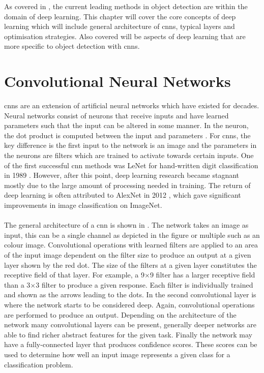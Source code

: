 As covered in , the current leading methods in object detection are within the domain of deep learning. This chapter will cover the core concepts of deep learning which will include general architecture of \glspl{cnn}, typical layers and optimisation strategies. Also covered will be aspects of deep learning that are more specific to object detection with \glspl{cnn}.

\section{Convolutional Neural Networks}
\glspl{cnn} are an extension of artificial neural networks which have existed for decades. Neural networks consist of neurons that receive inputs and have learned parameters such that the input can be altered in some manner. In the neuron, the dot product is computed between the input and parameters \cite{cs321n}. For \glspl{cnn}, the key difference is the first input to the network is an image and the parameters in the neurons are filters which are trained to activate towards certain inputs. One of the first successful \gls{cnn} methods was LeNet for hand-written digit classification in 1989 \cite{lenet}. However, after this point, deep learning research became stagnant mostly due to the large amount of processing needed in training. The return of deep learning is often attributed to AlexNet in 2012 \cite{alexnet}, which gave significant improvements in image classification on ImageNet.
\\\\
The general architecture of a \gls{cnn} is shown in . The network takes an image as input, this can be a single channel as depicted in the figure or multiple such as an colour image. Convolutional operations with learned filters are applied to an area of the input image dependent on the filter size to produce an output at a given layer shown by the red dot. The size of the filters at a given layer constitutes the receptive field of that layer. For example, a 9$\times$9 filter has a larger receptive field than a 3$\times$3 filter to produce a given response. Each filter is individually trained and shown as the arrows leading to the dots. In the second convolutional layer is where the network starts to be considered deep. Again, convolutional operations are performed to produce an output. Depending on the architecture of the network many convolutional layers can be present, generally deeper networks are able to find richer abstract features for the given task. Finally the network may have a fully-connected layer that produces confidence scores. These scores can be used to determine how well an input image represents a given class for a classification problem.

